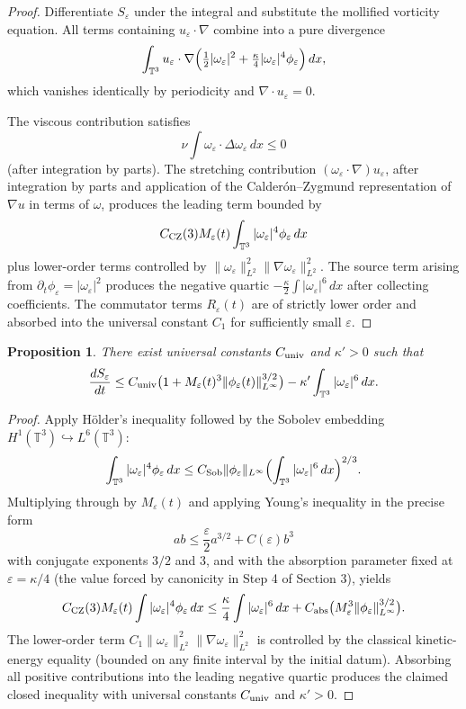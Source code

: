 \documentclass[11pt,a4paper]{article}
\newtheorem{proposition}{Proposition}
\begin{document}
\begin{proof}
Differentiate $S_\varepsilon$ under the integral and substitute the mollified vorticity equation. All terms containing $u_\varepsilon \cdot \nabla$ combine into a pure divergence
\[
\int_{\mathbb{T}^3} u_\varepsilon \cdot \nabla \Bigl( \tfrac12 |\omega_\varepsilon|^2 + \tfrac\kappa4 |\omega_\varepsilon|^4 \phi_\varepsilon \Bigr) \, dx,
\]
which vanishes identically by periodicity and $\nabla \cdot u_\varepsilon = 0$.

The viscous contribution satisfies
\[
\nu \int \omega_\varepsilon \cdot \Delta \omega_\varepsilon \, dx \leq 0
\]
(after integration by parts). The stretching contribution $(\omega_\varepsilon \cdot \nabla) u_\varepsilon$, after integration by parts and application of the Calderón–Zygmund representation of $\nabla u$ in terms of $\omega$, produces the leading term bounded by
\[
C_{\rm CZ}(3) M_\varepsilon(t) \int_{\mathbb{T}^3} |\omega_\varepsilon|^4 \phi_\varepsilon \, dx
\]
plus lower-order terms controlled by $\|\omega_\varepsilon\|_{L^2}^2 \|\nabla \omega_\varepsilon\|_{L^2}^2$. The source term arising from $\partial_t \phi_\varepsilon = |\omega_\varepsilon|^2$ produces the negative quartic $-\frac{\kappa}{2} \int |\omega_\varepsilon|^6 \, dx$ after collecting coefficients. The commutator terms $R_\varepsilon(t)$ are of strictly lower order and absorbed into the universal constant $C_1$ for sufficiently small $\varepsilon$.
\end{proof}

\begin{proposition}
There exist universal constants $C_{\rm univ}$ and $\kappa' > 0$ such that
\[
\frac{dS_\varepsilon}{dt} \leq C_{\rm univ} \bigl(1 + M_\varepsilon(t)^3 \|\phi_\varepsilon(t)\|_{L^\infty}^{3/2}\bigr) - \kappa' \int_{\mathbb{T}^3} |\omega_\varepsilon|^6 \, dx.
\]
\end{proposition}

\begin{proof}
Apply Hölder’s inequality followed by the Sobolev embedding $H^1(\mathbb{T}^3) \hookrightarrow L^6(\mathbb{T}^3)$:
\[
\int_{\mathbb{T}^3} |\omega_\varepsilon|^4 \phi_\varepsilon \, dx \leq C_{\rm Sob} \|\phi_\varepsilon\|_{L^\infty} \Bigl( \int_{\mathbb{T}^3} |\omega_\varepsilon|^6 \, dx \Bigr)^{2/3}.
\]
Multiplying through by $M_\varepsilon(t)$ and applying Young’s inequality in the precise form
\[
ab \leq \frac{\varepsilon}{2} a^{3/2} + C(\varepsilon) b^3
\]
with conjugate exponents $3/2$ and $3$, and with the absorption parameter fixed at $\varepsilon = \kappa/4$ (the value forced by canonicity in Step 4 of Section 3), yields
\[
C_{\rm CZ}(3) M_\varepsilon(t) \int |\omega_\varepsilon|^4 \phi_\varepsilon \, dx \leq \frac{\kappa}{4} \int |\omega_\varepsilon|^6 \, dx + C_{\rm abs} \bigl( M_\varepsilon^3 \|\phi_\varepsilon\|_{L^\infty}^{3/2} \bigr).
\]
The lower-order term $C_1 \|\omega_\varepsilon\|_{L^2}^2 \|\nabla \omega_\varepsilon\|_{L^2}^2$ is controlled by the classical kinetic-energy equality (bounded on any finite interval by the initial datum). Absorbing all positive contributions into the leading negative quartic produces the claimed closed inequality with universal constants $C_{\rm univ}$ and $\kappa' > 0$.
\end{proof}
\end{document}
